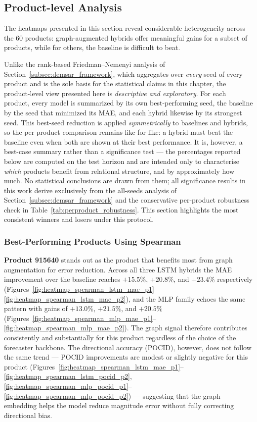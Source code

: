 \subsection{Product-level Analysis}
\label{subsec:product_level_analysis}

The heatmaps presented in this section reveal considerable heterogeneity across the
60 products: graph-augmented hybrids offer meaningful gains for a subset of
products, while for others, the baseline is difficult to beat.

Unlike the rank-based Friedman--Nemenyi analysis of
Section~\ref{subsec:demsar_framework}, which aggregates over \emph{every} seed of
every product and is the sole basis for the statistical claims in this chapter, the
product-level view presented here is \emph{descriptive and exploratory}. For each product, every model is summarized by its own best-performing seed, the baseline by the seed that minimized its MAE, and each hybrid likewise by its strongest seed.
This best-seed reduction is applied \emph{symmetrically} to baselines and hybrids,
so the per-product comparison remains like-for-like: a hybrid must beat the baseline
even when both are shown at their best performance. It is, however, a best-case summary rather
than a significance test --- the percentages reported below are computed on the test
horizon and are intended only to characterise \emph{which} products benefit from
relational structure, and by approximately how much. No statistical conclusions are drawn
from them; all significance results in this work derive exclusively from the
all-seeds analysis of Section~\ref{subsec:demsar_framework} and the conservative
per-product robustness check in Table~\ref{tab:perproduct_robustness}. This section
highlights the most consistent winners and losers under this protocol.

\subsubsection*{Best-Performing Products Using Spearman}
\textbf{Product 915640} stands out as the product that benefits most from graph
augmentation for error reduction. Across all three LSTM hybrids the MAE
improvement over the baseline reaches \(+15.5\%\), \(+20.8\%\), and \(+23.4\%\)
respectively (Figures~\ref{fig:heatmap_spearman_lstm_mae_p1}--\ref{fig:heatmap_spearman_lstm_mae_p2}),
and the MLP family echoes the same pattern with gains of \(+13.0\%\), \(+21.5\%\),
and \(+20.5\%\) (Figures~\ref{fig:heatmap_spearman_mlp_mae_p1}--\ref{fig:heatmap_spearman_mlp_mae_p2}).
The graph signal therefore contributes consistently and substantially for this product
regardless of the choice of the forecaster backbone. The directional accuracy (POCID),
however, does not follow the same trend — POCID improvements are modest or slightly
negative for this product (Figures~\ref{fig:heatmap_spearman_lstm_mae_p1}--\ref{fig:heatmap_spearman_lstm_pocid_p2},
\ref{fig:heatmap_spearman_mlp_pocid_p1}--\ref{fig:heatmap_spearman_mlp_pocid_p2}) — suggesting that
the graph embedding helps the model reduce magnitude error without fully correcting
directional bias.

